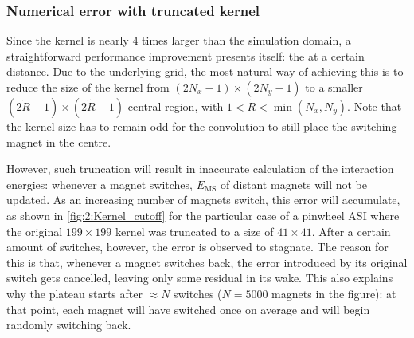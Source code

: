 \subsubsection{Numerical error with truncated kernel}\label{sec:2:Kernels:Error}
Since the kernel is nearly 4 times larger than the simulation domain, a straightforward performance improvement presents itself:  the  at a certain distance.
Due to the underlying grid, the most natural way of achieving this is to reduce the size of the kernel from $(2N_x-1) \times (2N_y-1)$ to a smaller $(2\widetilde{R}-1) \times (2\widetilde{R}-1)$ central region, with $1 < \widetilde{R} < \min(N_x,N_y)$.
Note that the kernel size has to remain odd for the convolution to still place the switching magnet in the centre. \par
However, such truncation will result in inaccurate calculation of the interaction energies: whenever a magnet switches, $E_\mathrm{MS}$ of distant magnets will not be updated.
As an increasing number of magnets switch, this error will accumulate, as shown in \cref{fig:2:Kernel_cutoff} for the particular case of a pinwheel ASI where the original $199 \times 199$ kernel was truncated to a size of $41 \times 41$.
After a certain amount of switches, however, the error is observed to stagnate.
The reason for this is that, whenever a magnet switches back, the error introduced by its original switch gets cancelled, leaving only some residual  in its wake.
This also explains why the plateau starts after $\approx N$ switches ($N=5000$ magnets in the figure): at that point, each magnet will have switched once on average and will begin randomly switching back.

\vspace{-1em}
\vspace{-1em}

